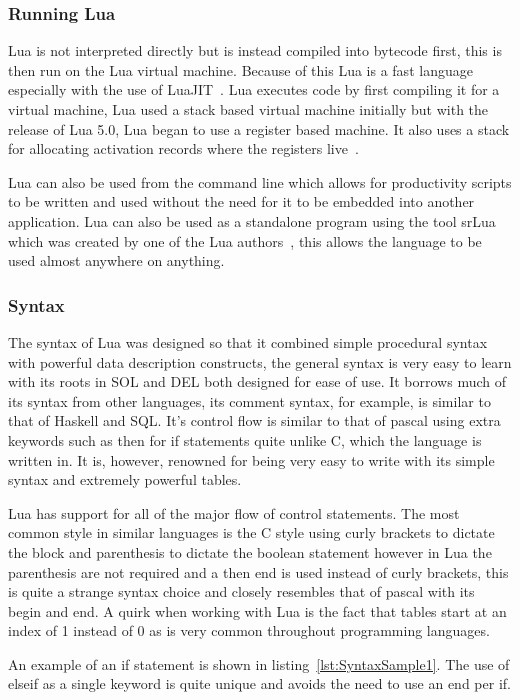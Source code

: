 \documentclass[11pt,a4paper,titlepage]{article}
\begin{document}
\subsubsection{Running Lua}
	Lua is not interpreted directly but is instead compiled into bytecode first, this is then run on the Lua virtual machine. Because of this Lua is a fast language especially with the use of LuaJIT~\cite{LuaJIT}. Lua executes code by first compiling it for a virtual machine, Lua used a stack based virtual machine initially but with the release of Lua 5.0, Lua began to use a register based machine. It also uses a stack for allocating activation records where the registers live~\cite{IerusalimschyImplementation}.

	Lua can also be used from the command line which allows for productivity scripts to be written and used without the need for it to be embedded into another application. Lua can also be used as a standalone program using the tool srLua which was created by one of the Lua authors~\cite{tecgrafLibAndTools}, this allows the language to be used almost anywhere on anything.

\subsubsection{Syntax}
	The syntax of Lua was designed so that it combined simple procedural syntax with powerful data description constructs, the general syntax is very easy to learn with its roots in SOL and DEL both designed for ease of use. It borrows much of its syntax from other languages, its comment syntax, for example, is similar to that of Haskell and SQL. It's control flow is similar to that of pascal using extra keywords such as then for if statements quite unlike C, which the language is written in. It is, however, renowned for being very easy to write with its simple syntax and extremely powerful tables.

	Lua has support for all of the major flow of control statements. The most common style in similar languages is the C style using curly brackets to dictate the block and parenthesis to dictate the boolean statement however in Lua the parenthesis are not required and a then end is used instead of curly brackets, this is quite a strange syntax choice and closely resembles that of pascal with its begin and end. A quirk when working with Lua is the fact that tables start at an index of 1 instead of 0 as is very common throughout programming languages.

	An example of an if statement is shown in listing~\ref{lst:SyntaxSample1}. The use of elseif as a single keyword is quite unique and avoids the need to use an end per if.
\end{document}
